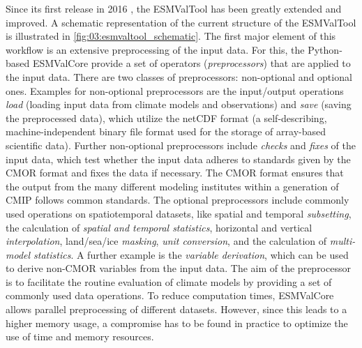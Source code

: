 Since its first release in 2016 \autocite{Eyring2016a}, the \ac{ESMValTool} has
been greatly extended and improved. A schematic representation of the current
structure of the \ac{ESMValTool} is illustrated in
\cref{fig:03:esmvaltool_schematic}. The first major element of this workflow is
an extensive preprocessing of the input data. For this, the Python-based
\acf{ESMValCore} provide a set of operators (\emph{preprocessors}) that are
applied to the input data. There are two classes of preprocessors: non-optional
and optional ones. Examples for non-optional preprocessors are the input/output
operations \emph{load} (loading input data from climate models and
observations) and \emph{save} (saving the preprocessed data), which utilize the
\ac{netCDF} format (a self-describing, machine-independent binary file format
used for the storage of array-based scientific data). Further non-optional
preprocessors include \emph{checks} and \emph{fixes} of the input data, which
test whether the input data adheres to standards given by the \ac{CMOR} format
and fixes the data if necessary. The \ac{CMOR} format ensures that the output
from the many different modeling institutes within a generation of \ac{CMIP}
follows common standards. The optional preprocessors include commonly used
operations on spatiotemporal datasets, like spatial and temporal
\emph{subsetting}, the calculation of \emph{spatial and temporal statistics},
horizontal and vertical \emph{interpolation}, land/sea/ice \emph{masking},
\emph{unit conversion}, and the calculation of \emph{multi-model statistics}. A
further example is the \emph{variable derivation}, which can be used to derive
non-\ac{CMOR} variables from the input data. The aim of the preprocessor is to
facilitate the routine evaluation of climate models by providing a set of
commonly used data operations. To reduce computation times, \ac{ESMValCore}
allows parallel preprocessing of different datasets. However, since this leads
to a higher memory usage, a compromise has to be found in practice to optimize
the use of time and memory resources.

